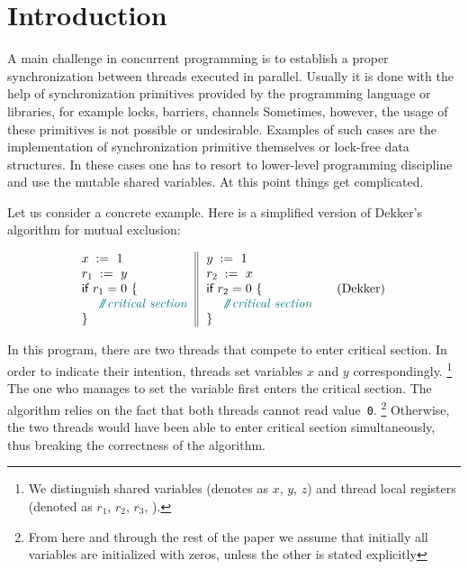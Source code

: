 \section{Introduction}
\label{sec:intro}

A main challenge in concurrent programming is 
to establish a proper synchronization between threads executed in parallel.     
Usually it is done with the help of synchronization primitives
provided by the programming language or libraries,
for example locks, barriers, channels \etc
Sometimes, however, the usage of these primitives
is not possible or undesirable. 
Examples of such cases are the implementation 
of synchronization primitive themselves
or lock-free data structures.
In these cases one has to resort to 
lower-level programming discipline and 
use the mutable shared variables. 
At this point things get complicated.


Let us consider a concrete example.
Here is a simplified version of Dekker's algorithm for mutual exclusion:

\begin{equation*}
\inarrII{
  \writeInst{}{x}{1} \\
  \readInst{}{r_1}{y}  \\
  \kw{if} {r_1 = 0} ~\{ \\
  ~~ \comment{critical section} \\
  \}
}{
  \writeInst{}{y}{1} \\
  \readInst{}{r_2}{x}  \\
  \kw{if} {r_2 = 0} ~\{ \\
  ~~ \comment{critical section} \\
  \}
}
\tag{Dekker}\label{ex:Dekker}
\end{equation*}

In this program, there are two threads that compete to enter critical section.
In order to indicate their intention, threads set 
variables $x$ and $y$ correspondingly.%
\footnote{We distinguish shared variables 
(denotes as $x$, $y$, $z$) and thread local registers 
(denoted as $r_1$, $r_2$, $r_3$, \etc).}
The one who manages to set the variable first enters the critical section.
The algorithm relies on the fact that both threads cannot read value~\texttt{0}.%
\footnote{From here and through the rest of the paper we assume that initially all 
variables are initialized with zeros, unless the other is stated explicitly}
Otherwise, the two threads would have been able 
to enter critical section simultaneously, 
thus breaking the correctness of the algorithm.

